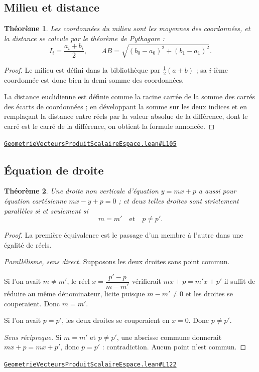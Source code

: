 \documentclass[11pt,a4paper]{article}
\theoremstyle{definition}
\theoremstyle{plain}
\newtheorem{theoreme}{Théorème}
\newcommand{\source}[2]{\par\smallskip\noindent\hfill{\footnotesize\href{#1}{\texttt{#2}}}\par\smallskip}
\begin{document}
\subsection{Milieu et distance}

\begin{theoreme}
Les coordonnées du milieu sont les moyennes des coordonnées, et la distance se calcule par
le théorème de Pythagore :
\[ I_i = \frac{a_i + b_i}{2} , \qquad
   AB = \sqrt{(b_0 - a_0)^{2} + (b_1 - a_1)^{2}} . \]
\end{theoreme}

\begin{proof}
Le milieu est défini dans la bibliothèque par $\frac{1}{2}(a + b)$ ; sa $i$-ième
coordonnée est donc bien la demi-somme des coordonnées.

La distance euclidienne est définie comme la racine carrée de la somme des carrés des
écarts de coordonnées ; en développant la somme sur les deux indices et en remplaçant la
distance entre réels par la valeur absolue de la différence, dont le carré est le carré de
la différence, on obtient la formule annoncée.
\end{proof}
\source{https://github.com/Commutator-IO/learn-lean/blob/main/courses/02-lycee/08-geometrie-vecteurs-produit-scalaire-espace/GeometrieVecteursProduitScalaireEspace.lean\#L105}{GeometrieVecteursProduitScalaireEspace.lean\#L105}

\subsection{Équation de droite}

\begin{theoreme}
Une droite non verticale d'équation $y = mx + p$ a aussi pour équation cartésienne
$mx - y + p = 0$ ; et deux telles droites sont strictement parallèles si et seulement si
\[ m = m' \quad\text{et}\quad p \ne p' . \]
\end{theoreme}

\begin{proof}
La première équivalence est le passage d'un membre à l'autre dans une égalité de réels.

\smallskip\noindent
\emph{Parallélisme, sens direct.} Supposons les deux droites sans point commun.

Si l'on avait $m \ne m'$, le réel $x = \dfrac{p' - p}{m - m'}$ vérifierait
$mx + p = m'x + p'$ \textemdash{} il suffit de réduire au même dénominateur, licite
puisque $m - m' \ne 0$ \textemdash{} et les droites se couperaient. Donc $m = m'$.

Si l'on avait $p = p'$, les deux droites se couperaient en $x = 0$. Donc $p \ne p'$.

\smallskip\noindent
\emph{Sens réciproque.} Si $m = m'$ et $p \ne p'$, une abscisse commune donnerait
$mx + p = mx + p'$, donc $p = p'$ : contradiction. Aucun point n'est commun.
\end{proof}
\source{https://github.com/Commutator-IO/learn-lean/blob/main/courses/02-lycee/08-geometrie-vecteurs-produit-scalaire-espace/GeometrieVecteursProduitScalaireEspace.lean\#L122}{GeometrieVecteursProduitScalaireEspace.lean\#L122}
\end{document}
